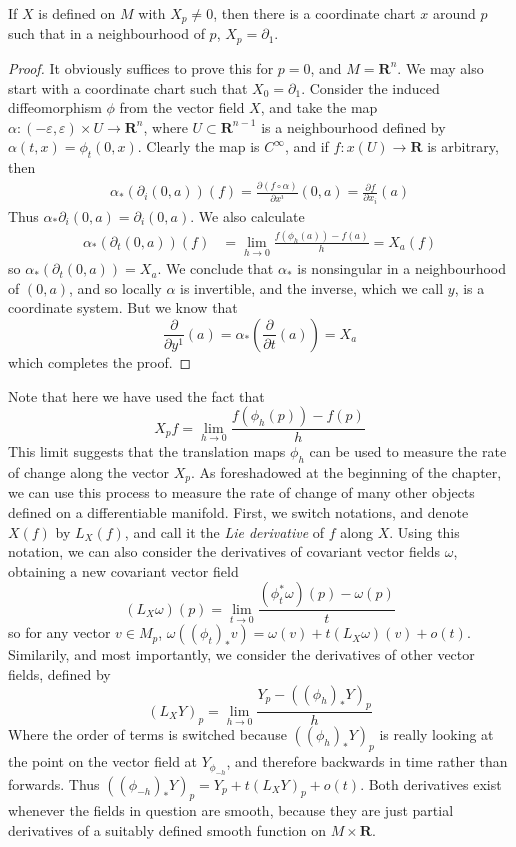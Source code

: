 \begin{theorem}
    If $X$ is defined on $M$ with $X_p \neq 0$, then there is a coordinate chart $x$ around $p$ such that in a neighbourhood of $p$, $X_p = \partial_1$.
\end{theorem}
\begin{proof}
    It obviously suffices to prove this for $p = 0$, and $M = \mathbf{R}^n$. We may also start with a coordinate chart such that $X_0 = \partial_1$. Consider the induced diffeomorphism $\phi$ from the vector field $X$, and take the map $\alpha: (-\varepsilon, \varepsilon) \times U \to \mathbf{R}^n$, where $U \subset \mathbf{R}^{n-1}$ is a neighbourhood defined by $\alpha(t,x) = \phi_t(0,x)$. Clearly the map is $C^\infty$, and if $f: x(U) \to \mathbf{R}$ is arbitrary, then
    \begin{align*}
        \alpha_* \left( \partial_i(0,a) \right)(f) = \frac{\partial (f \circ \alpha)}{\partial x^i} (0,a) = \frac{\partial f}{\partial x_i}(a)
    \end{align*}
    Thus $\alpha_* \partial_i(0,a) = \partial_i(0,a)$. We also calculate
    \begin{align*}
        \alpha_* \left( \partial_t(0,a) \right) (f) &= \lim_{h \to 0} \frac{f(\phi_{h}(a)) - f(a)}{h} = X_a(f)
    \end{align*}
    so $\alpha_*(\partial_t(0,a)) = X_a$. We conclude that $\alpha_*$ is nonsingular in a neighbourhood of $(0,a)$, and so locally $\alpha$ is invertible, and the inverse, which we call $y$, is a coordinate system. But we know that
    \[ \frac{\partial}{\partial y^1}(a) = \alpha_* \left( \frac{\partial}{\partial t}(a) \right) = X_a \]
    which completes the proof.
\end{proof}

Note that here we have used the fact that
%
\[ X_p f = \lim_{h \to 0} \frac{f(\phi_h(p)) - f(p)}{h} \]
%
This limit suggests that the translation maps $\phi_h$ can be used to measure the rate of change along the vector $X_p$. As foreshadowed at the beginning of the chapter, we can use this process to measure the rate of change of many other objects defined on a differentiable manifold. First, we switch notations, and denote $X(f)$ by $L_X(f)$, and call it the \emph{Lie derivative} of $f$ along $X$. Using this notation, we can also consider the derivatives of covariant vector fields $\omega$, obtaining a new covariant vector field
%
\[ (L_X \omega)(p) = \lim_{t \to 0} \frac{(\phi_t^*\omega)(p) - \omega(p)}{t} \]
%
so for any vector $v \in M_p$, $\omega((\phi_t)_* v) = \omega(v) + t (L_X \omega)(v) + o(t)$. Similarily, and most importantly, we consider the derivatives of other vector fields, defined by
%
\[ (L_X Y)_p = \lim_{h \to 0} \frac{Y_p - ((\phi_h)_* Y)_p}{h} \]
%
Where the order of terms is switched because $((\phi_h)_* Y)_p$ is really looking at the point on the vector field at $Y_{\phi_{-h}}$, and therefore backwards in time rather than forwards. Thus $((\phi_{-h})_* Y)_p = Y_p + t (L_X Y)_p + o(t)$. Both derivatives exist whenever the fields in question are smooth, because they are just partial derivatives of a suitably defined smooth function on $M \times \mathbf{R}$.

